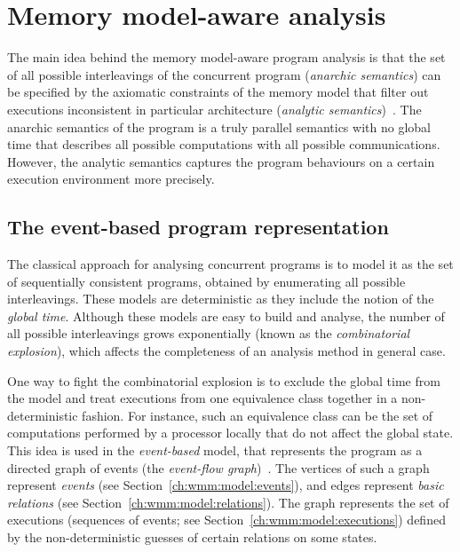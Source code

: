 \chapter{Memory model-aware analysis}
\label{ch:wmm}

The main idea behind the memory model-aware program analysis is that the set of all possible interleavings of the concurrent program (\textit{anarchic semantics}) can be specified by the axiomatic constraints of the memory model that filter out executions inconsistent in particular architecture (\textit{analytic semantics})~\cite{alglave2016syntax}.
The anarchic semantics of the program is a truly parallel semantics with no global time that describes all possible computations with all possible communications.
However, the analytic semantics captures the program behaviours on a certain execution environment more precisely.


\section{The event-based program representation}
\label{ch:wmm:event}

The classical approach for analysing concurrent programs is to model it as the set of sequentially consistent programs, obtained by enumerating all possible interleavings.
These models are deterministic as they include the notion of the \textit{global time}. %
Although these models are easy to build and analyse, the number of all possible interleavings grows exponentially (known as the \textit{combinatorial explosion}), which affects the completeness of an analysis method in general case.

One way to fight the combinatorial explosion is to exclude the global time from the model and treat executions from one equivalence class together in a non-deterministic fashion.
For instance, such an equivalence class can be the set of computations performed by a processor locally that do not affect the global state.
This idea is used in the \textit{event-based} model, that represents the program as a directed graph of events (the \textit{event-flow graph})~\cite{alglave2010shared}.
The vertices of such a graph represent \textit{events} (see Section~\ref{ch:wmm:model:events}), and edges represent \textit{basic relations} (see Section~\ref{ch:wmm:model:relations}).
The graph represents the set of executions (sequences of events; see Section~\ref{ch:wmm:model:executions}) defined by the non-deterministic guesses of certain relations on some states.

